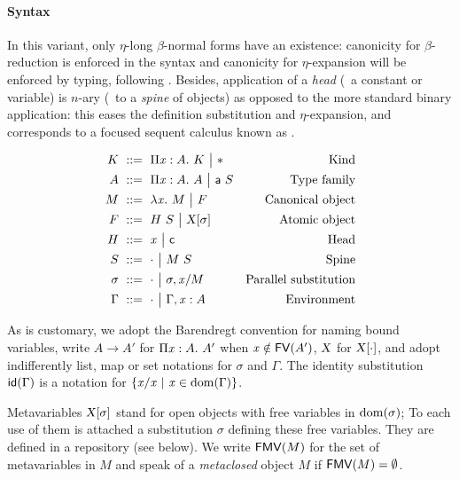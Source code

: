 \documentclass[9pt]{sigplanconf}
\begin{document}
\paragraph{Syntax}

In this variant, only $\eta$-long $\beta$-normal forms have an
existence: canonicity for $\beta$-reduction is enforced in the syntax
and canonicity for $\eta$-expansion will be enforced by typing,
following \cite{hl07mechanizing}. Besides, application of a
\emph{head} (\ie\ a constant or variable) is $n$-ary (\ie\ to a
\emph{spine} of objects) as opposed to the more standard binary
application: this eases the definition substitution and
$\eta$-expansion, and corresponds to a focused sequent calculus known
as  \cite{herbelin1995λ}.

\begin{align*}
  K &\ ::=\ 
  \Pi{\ensuremath{\text{\textit{x}}}}:{A}.\  K \ {\big|}\ 
  \mathsf{*} &
  \text{Kind}\\
  A &\ ::=\ 
  \Pi{\ensuremath{\text{\textit{x}}}}:{A}.\  A \ {\big|}\ 
  {\text{\textsf{a}}}\  S &
  \text{Type family} \\
  M &\ ::=\ 
  \lambda{\ensuremath{\text{\textit{x}}}}.\  M \ {\big|}\ 
  F &
  \text{Canonical object} \\
  F &\ ::=\  {H}\  S
  \ {\big|}\ 
  {\text{\textsl{X}}}[{\sigma}] &
  \text{Atomic object} \\
  H &\ ::=\ 
  \text{\textit{x}} \ {\big|}\ 
  \text{\textsf{c}} &
  \text{Head}\\
  S &\ ::=\ 
  \cdot \ {\big|}\ 
  {M}\ {S} &
  \text{Spine}\\
  \sigma &\ ::=\ 
  \cdot \ {\big|}\ 
  {\sigma},{{\text{\textit{x}}}/{M}} &
  \text{Parallel substitution} \\
  \Gamma &\ ::=\ 
  \cdot \ {\big|}\ 
  {\Gamma},{{\text{\textit{x}}}:{A}} &
  \text{Environment}
\end{align*}

As is customary, we adopt the Barendregt convention for naming bound
variables, write $A\to A'$ for $\Pi{\ensuremath{\text{\textit{x}}}}:{A}.\  A'$ when $\text{\textit{x}}\notin {\text{\textsf{FV}}}({A'})$,
$\text{\textsl{X}}$ for ${\text{\textsl{X}}}[{\cdot}]$, and adopt indifferently list, map
or set notations for $\sigma$ and $\Gamma$. The identity substitution
${\text{\textsf{id}}}({\Gamma})$ is a notation for $\{{\text{\textit{x}}}/{\text{\textit{x}}}\ |\ \text{\textit{x}}
\in\operatorname{dom}{\!(\Gamma)}\}$.

Metavariables ${\text{\textsl{X}}}[{\sigma}]$ stand for open objects with free
variables in $\operatorname{dom}{\!(\sigma)}$; To each use of them is attached a
substitution $\sigma$ defining these free variables. They are defined
in a repository (see below). We write ${\text{\textsf{FMV}}}({M})$ for the set of
metavariables in $M$ and speak of a \emph{metaclosed} object $M$ if
${\text{\textsf{FMV}}}({M}) = \emptyset$.
\end{document}

